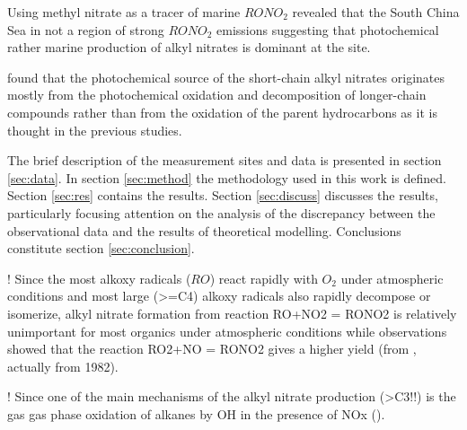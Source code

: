 \documentclass[11pt,a4paper]{article}
\begin{document}
Using methyl nitrate as a tracer of marine $RONO_2$ \cite{Simpson2006} revealed that the South China Sea in not a region of strong $RONO_2$ emissions suggesting that photochemical rather marine production of alkyl nitrates is dominant at the site.

\cite{Worton2010} found that the photochemical source of the short-chain alkyl nitrates originates mostly from the photochemical oxidation and decomposition of longer-chain compounds rather than from the oxidation of the parent hydrocarbons as it is thought in the previous studies.

The brief description of the measurement sites and data is presented in section \ref{sec:data}. In section \ref{sec:method} the methodology used in this work is defined. Section \ref{sec:res} contains the results. Section \ref{sec:discuss} discusses the results, particularly focusing attention on the analysis of the discrepancy between the observational data and the results of theoretical modelling. Conclusions constitute section \ref{sec:conclusion}.

! Since the most alkoxy radicals ($RO$) react rapidly with $O_2$ under atmospheric conditions and most large (>=C4) alkoxy radicals also rapidly decompose or isomerize, alkyl nitrate formation from reaction RO+NO2 = RONO2 is relatively unimportant for most organics under atmospheric conditions while observations showed that the reaction RO2+NO = RONO2 gives a higher yield (from \citep{Atkinson2000}, actually from 1982).

! Since one of the main mechanisms of the alkyl nitrate production (>C3!!) is the gas gas phase oxidation of alkanes by OH in the presence of NOx (\citep{Newland2013}).
\end{document}
